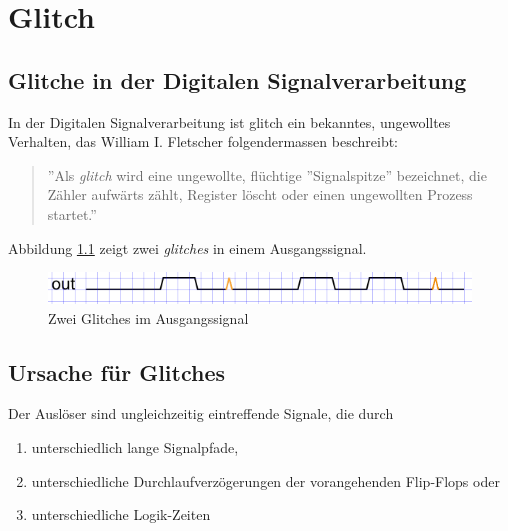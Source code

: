 
\chapter{Glitch}\label{chap.glitch}

\section{Glitche in der Digitalen Signalverarbeitung}\label{sect.glitch_def}
In der Digitalen Signalverarbeitung ist glitch ein bekanntes, ungewolltes Verhalten, das William I. Fletscher folgendermassen beschreibt:

\begin{quote}
''Als \textit{glitch}  wird eine ungewollte, flüchtige ''Signalspitze'' bezeichnet, die Zähler aufwärts zählt, Register löscht oder einen ungewollten Prozess startet.'' \cite{F_glitches}
\end{quote}


Abbildung \ref{fig.glitch.def} zeigt zwei \textit{glitches} in einem Ausgangssignal.\\

\begin{figure}[H]
	\includegraphics[width=\textwidth]{images/glitch/def_glitch_1.png}
	\caption{Zwei Glitches im Ausgangssignal}
	\label{fig.glitch.def}
\end{figure}


\section{Ursache für Glitches}\label{sect.glitch_ursache}

Der Auslöser sind ungleichzeitig eintreffende Signale, die durch

\begin{enumerate}
\item unterschiedlich lange Signalpfade,
\item unterschiedliche Durchlaufverzögerungen der vorangehenden Flip-Flops oder
\item unterschiedliche Logik-Zeiten
\end{enumerate}


